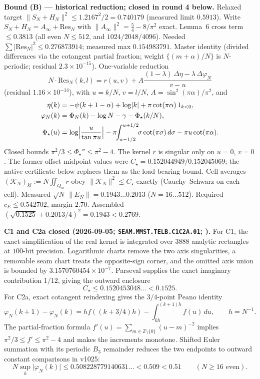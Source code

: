 \par\smallskip\noindent\textbf{Bound (B) --- historical reduction; closed in round 4 below.}
Relaxed target $\lVert S_N+H_N\rVert^2\le1.2167^2/2=0.740179$ (measured limit
$0.5913$).  Write $S_N+H_N=A_\infty+\mathrm{Res}_N$ with
$\lVert A_\infty\rVert^2=\tfrac54-8/\pi^2$ exact.  Lemma~6 cross term
${}\le0.3813$ (all even $N\le512$, and $1024/2048/4096$).  Needed
$\sum\lvert\mathrm{Res}_N\rvert^2\le0.276873914$; measured max $0.154983791$.
Master identity (divided differences via the cotangent partial fraction; weight
$\{(m+\alpha)/N\}$ is $N$-periodic; residual $2.3{\times}10^{-15}$).
One-variable reduction
\begin{equation*}
  N\cdot\mathrm{Res}_N(k,l)
  =r(u,v)
  +A\frac{(1-\lambda)\,\Delta\eta-\lambda\,\Delta\varphi_N}{v-u}
\end{equation*}
(residual $1.16{\times}10^{-14}$), with $u=k/N$, $v=l/N$, $A=\sin^2(\pi\alpha)/\pi^2$,
and
\begin{align*}
  \eta(k)
  &=-\psi(k+1-\alpha)+\log\lvert k\rvert+\pi\cot(\pi\alpha)\,1_{k<0},\\
  \varphi_N(k)
  &=\Phi_N(k)-\log N-\gamma-\Phi_\star(k/N),\\
  \Phi_\star(u)
  &=\log\Bigl\lvert\frac{u}{\tan\pi u}\Bigr\rvert
    -\pi\!\!\int_{u-1/2}^{u+1/2}\!\!\sigma\cot(\pi\sigma)\,d\sigma
    -\pi u\cot(\pi\alpha).
\end{align*}
Closed bounds $\pi^2/3\le\Phi_\star''\le\pi^2-4$.  The kernel $r$ is singular
only on $u=0$, $v=0$.  The former offset midpoint values were
$C_\star=0.152044949/0.152045069$; the native certificate below replaces them
as the load-bearing bound.
Cell averages $(\mathcal K_N)_{kl}:=N\iint_{Q_{kl}}r$ obey
$\lVert\mathcal K_N\rVert^2\le C_\star$ exactly (Cauchy--Schwarz on each cell).
Measured $\sqrt N\,\lVert E_N\rVert=0.1943\ldots0.2013$ ($N=16\ldots512$).
Required $c_E\le0.542702$, margin $2.70$.  Assembled
$(\sqrt{0.1525}+0.2013/4)^2=0.1943<0.2769$.

\par\smallskip\noindent\textbf{C1 and C2a closed (2026-09-05;
\texttt{SEAM.MMST.TELB.C1C2A.01};
).}
For C1, the exact simplification of the real kernel is integrated over $3888$
analytic rectangles at $100$-bit precision.  Logarithmic charts remove the two
axis singularities, a removable seam chart treats the opposite-sign corner, and
the omitted axis union is bounded by $3.1570760454{\times}10^{-7}$.  Parseval
supplies the exact imaginary contribution $1/12$, giving the outward enclosure
\[
 C_\star\le0.1520453048\ldots<0.1525.
\]
For C2a, exact cotangent reindexing gives the $3/4$-point Peano identity
\[
 \varphi_N(k+1)-\varphi_N(k)
 =h f((k+3/4)h)-\int_{kh}^{(k+1)h}f(u)\,du,
 \qquad h=N^{-1}.
\]
The partial-fraction formula
$f'(u)=\sum_{m\in\mathbb Z\setminus\{0\}}(u-m)^{-2}$ implies
$\pi^2/3\le f'\le\pi^2-4$ and makes the increments monotone.  Shifted Euler
summation with its periodic $B_3$ remainder reduces the two endpoints to outward
constant comparisons in v1025:
\[
 N\sup_k\lvert\varphi_N(k)\rvert
 \le0.508228779140631\ldots<0.509<0.51
 \qquad(N\ge16\text{ even}).
\]


